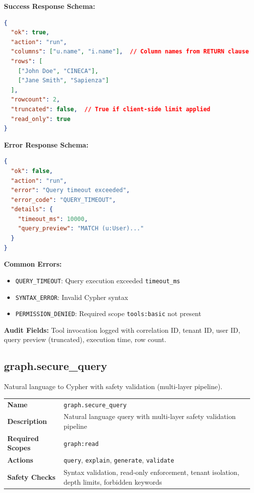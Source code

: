 \textbf{Success Response Schema:}
\begin{lstlisting}[language=json]
{
  "ok": true,
  "action": "run",
  "columns": ["u.name", "i.name"],  // Column names from RETURN clause
  "rows": [
    ["John Doe", "CINECA"],
    ["Jane Smith", "Sapienza"]
  ],
  "rowcount": 2,
  "truncated": false,  // True if client-side limit applied
  "read_only": true
}
\end{lstlisting}

\textbf{Error Response Schema:}
\begin{lstlisting}[language=json]
{
  "ok": false,
  "action": "run",
  "error": "Query timeout exceeded",
  "error_code": "QUERY_TIMEOUT",
  "details": {
    "timeout_ms": 10000,
    "query_preview": "MATCH (u:User)..."
  }
}
\end{lstlisting}

\textbf{Common Errors:}
\begin{itemize}
    \item \texttt{QUERY\_TIMEOUT}: Query execution exceeded \texttt{timeout\_ms}
    \item \texttt{SYNTAX\_ERROR}: Invalid Cypher syntax
    \item \texttt{PERMISSION\_DENIED}: Required scope \texttt{tools:basic} not present
\end{itemize}

\textbf{Audit Fields:} Tool invocation logged with correlation ID, tenant ID, user ID, query preview (truncated), execution time, row count.

\subsection{graph.secure\_query}

Natural language to Cypher with safety validation (multi-layer pipeline).

\begin{table}[ht]
\centering
\small
\begin{tabularx}{\textwidth}{lX}
    \hline
    \textbf{Name} & \texttt{graph.secure\_query} \\
    \textbf{Description} & Natural language query with multi-layer safety validation pipeline \\
    \textbf{Required Scopes} & \texttt{graph:read} \\
    \textbf{Actions} & \texttt{query}, \texttt{explain}, \texttt{generate}, \texttt{validate} \\
    \textbf{Safety Checks} & Syntax validation, read-only enforcement, tenant isolation, depth limits, forbidden keywords \\
    \hline
\end{tabularx}
\end{table}

